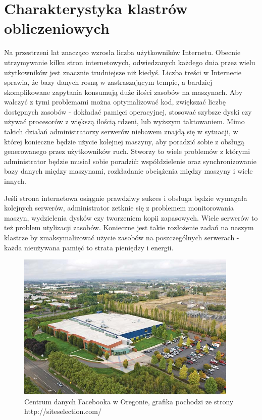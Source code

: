\documentclass[10pt,a4paper,titlepage,twoside]{report}
\begin{document}
\section{Charakterystyka klastrów obliczeniowych}
\indent \indent Na przestrzeni lat znacząco wzrosła liczba użytkowników Internetu\cite{ad1}. Obecnie utrzymywanie kilku stron internetowych, odwiedzanych każdego dnia przez wielu użytkowników jest znacznie trudniejsze niż kiedyś\cite{ad1}. Liczba treści w Internecie sprawia, że bazy danych rosną w zastraszającym tempie, a bardziej skomplikowane zapytania konsumują duże ilości zasobów na maszynach. Aby walczyć z tymi problemami można optymalizować kod, zwiększać liczbę dostępnych zasobów - dokładać pamięci operacyjnej, stosować szybsze dyski czy używać procesorów z większą ilością rdzeni, lub wyższym taktowaniem. Mimo takich działań administratorzy serwerów niebawem znajdą się w sytuacji, w której konieczne będzie użycie kolejnej maszyny, aby poradzić sobie z obsługą generowanego przez użytkowników ruch\cite{ad2}. Stworzy to wiele problemów z którymi administrator będzie musiał sobie poradzić: współdzielenie oraz synchronizowanie bazy danych między maszynami, rozkładanie obciążenia między maszyny i wiele innych\cite{ad2}.

Jeśli strona internetowa osiągnie prawdziwy sukces i obsługa będzie wymagała kolejnych serwerów, administrator zetknie się z problemem monitorowania maszyn, wydzielenia dysków czy tworzeniem kopii zapasowych. Wiele serwerów to też problem utylizacji zasobów. Konieczne jest takie rozłożenie zadań na naszym klastrze by zmaksymalizować użycie zasobów na poszczególnych serwerach - każda nieużywana pamięć to strata pieniędzy i energii\cite{ad3}.

\begin{figure}[ht!]
	\centering
	\includegraphics[scale=0.7]{pics/Selection_615.png}
	\caption{Centrum danych Facebooka w Oregonie, grafika pochodzi ze strony http://siteselection.com/}
	\label{facebook_dc}
\end{figure}
\end{document}
